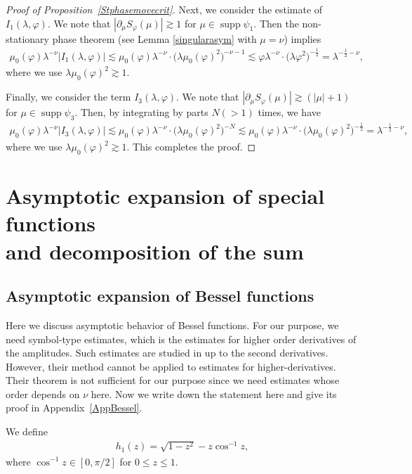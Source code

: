 \documentclass[pdftex]{sigma}
\numberwithin{equation}{section}
\DeclareMathOperator{\supp}{supp}%
\def\f{\varphi}
\def\g{\psi}
\def\l{\lambda}
\def\m{\mu}
\def\n{\nu}
\def\pa{\partial}
\begin{document}
\begin{proof}[Proof of Proposition~\ref{Stphasemovecrit}]
Next, we consider the estimate of $I_{1}(\l,\f)$. We note that $|\pa_{\m}S_{\f}(\m)|\gtrsim 1$ for $\m\in \supp \g_1$.
Then the non-stationary phase theorem (see Lemma \ref{singularasym} with $\m=\n$) implies
\begin{align*}
\m_0(\f)\l^{-\n}|I_1(\l,\f)|\lesssim \m_0(\f)\l^{-\n}\cdot \bigl(\l \m_0(\f)^2\bigr)^{-\n-1}\lesssim \f\l^{-\n}\cdot \bigl(\l \f^2\bigr)^{-\frac{1}{2}}=\l^{-\frac{1}{2}-\n},
\end{align*}
where we use $\l \m_0(\f)^2\gtrsim 1$.

Finally, we consider the term $I_{3}(\l,\f)$. We note that $|\pa_{\m}S_{\f}(\m)|\gtrsim (|\m|+1)$ for $\m\in \supp \g_3$. Then, by integrating by parts $N(>1)$ times, we have
\begin{align*}
\m_0(\f)\l^{-\n}|I_3(\l,\f)|\lesssim \m_0(\f)\l^{-\n}\cdot \bigl(\l \m_0(\f)^2\bigr)^{-N}\lesssim \m_0(\f)\l^{-\n}\cdot \bigl(\l \m_0(\f)^2\bigr)^{-\frac{1}{2}}=\l^{-\frac{1}{2}-\n},
\end{align*}
where we use $\l \m_0(\f)^2\gtrsim 1$. This completes the proof.
\end{proof}

\section[Asymptotic expansion of special functions and decomposition of the sum]{Asymptotic expansion of special functions\\ and decomposition of the sum}

\subsection{Asymptotic expansion of Bessel functions}


Here we discuss asymptotic behavior of Bessel functions. For our purpose, we need symbol-type estimates, which is the estimates for higher order derivatives of the amplitudes. Such estimates are studied in \cite[Theorem 9.1]{IJ} up to the second derivatives. However, their method cannot be applied to estimates for higher-derivatives. Their theorem is not sufficient for our purpose since we need estimates whose order depends on $\n$ here.
Now we write down the statement here and give its proof in Appendix~\ref{AppBessel}.

We define
\begin{align}\label{hdef}
h_1(z)=\sqrt{1-z^2}-z\cos^{-1} z,
\end{align}
where $\cos^{-1} z\in [0,\pi/2]$ for $0\leq z\leq 1$.
\end{document}
